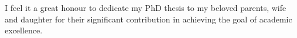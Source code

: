 \begin{dedication}
I feel it a great honour to dedicate my PhD thesis to my beloved parents, wife and daughter for their significant contribution in achieving the goal of academic excellence.
\end{dedication}